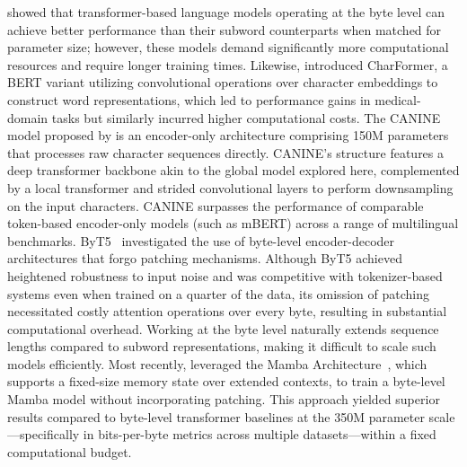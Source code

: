 \cite{Choe2019BridgingTG} showed that transformer-based language models operating at the byte level can achieve better performance than their subword counterparts when matched for parameter size; however, these models demand significantly more computational resources and require longer training times. Likewise, \cite{el2020characterbert} introduced CharFormer, a BERT variant utilizing convolutional operations over character embeddings to construct word representations, which led to performance gains in medical-domain tasks but similarly incurred higher computational costs. The CANINE model proposed by \cite{clark2022canine} is an encoder-only architecture comprising 150M parameters that processes raw character sequences directly. CANINE's structure features a deep transformer backbone akin to the global model explored here, complemented by a local transformer and strided convolutional layers to perform downsampling on the input characters. CANINE surpasses the performance of comparable token-based encoder-only models (such as mBERT) across a range of multilingual benchmarks. ByT5~\citep{xue2022byt5} investigated the use of byte-level encoder-decoder architectures that forgo patching mechanisms. Although ByT5 achieved heightened robustness to input noise and was competitive with tokenizer-based systems even when trained on a quarter of the data, its omission of patching necessitated costly attention operations over every byte, resulting in substantial computational overhead. Working at the byte level naturally extends sequence lengths compared to subword representations, making it difficult to scale such models efficiently. Most recently, \cite{wang2024mambabyte} leveraged the Mamba Architecture~\citep{gu2023mamba}, which supports a fixed-size memory state over extended contexts, to train a byte-level Mamba model without incorporating patching. This approach yielded superior results compared to byte-level transformer baselines at the 350M parameter scale—specifically in bits-per-byte metrics across multiple datasets—within a fixed computational budget.

